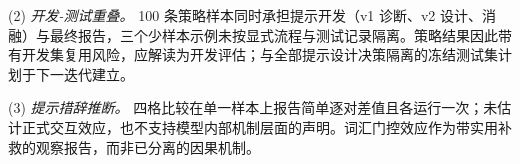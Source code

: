\documentclass[11pt]{article}
\begin{document}
(2) \textit{{\cjkfont 开\allowbreak 发}-{\cjkfont 测\allowbreak 试\allowbreak 重\allowbreak 叠\allowbreak 。}} 100 {\cjkfont 条\allowbreak 策\allowbreak 略\allowbreak 样\allowbreak 本\allowbreak 同\allowbreak 时\allowbreak 承\allowbreak 担\allowbreak 提\allowbreak 示\allowbreak 开\allowbreak 发\allowbreak （}v1 {\cjkfont 诊\allowbreak 断\allowbreak 、}v2 {\cjkfont 设\allowbreak 计\allowbreak 、\allowbreak 消\allowbreak 融\allowbreak ）\allowbreak 与\allowbreak 最\allowbreak 终\allowbreak 报\allowbreak 告\allowbreak ，\allowbreak 三\allowbreak 个\allowbreak 少\allowbreak 样\allowbreak 本\allowbreak 示\allowbreak 例\allowbreak 未\allowbreak 按\allowbreak 显\allowbreak 式\allowbreak 流\allowbreak 程\allowbreak 与\allowbreak 测\allowbreak 试\allowbreak 记\allowbreak 录\allowbreak 隔\allowbreak 离\allowbreak 。\allowbreak 策\allowbreak 略\allowbreak 结\allowbreak 果\allowbreak 因\allowbreak 此\allowbreak 带\allowbreak 有\allowbreak 开\allowbreak 发\allowbreak 集\allowbreak 复\allowbreak 用\allowbreak 风\allowbreak 险\allowbreak ，\allowbreak 应\allowbreak 解\allowbreak 读\allowbreak 为\allowbreak 开\allowbreak 发\allowbreak 评\allowbreak 估\allowbreak ；\allowbreak 与\allowbreak 全\allowbreak 部\allowbreak 提\allowbreak 示\allowbreak 设\allowbreak 计\allowbreak 决\allowbreak 策\allowbreak 隔\allowbreak 离\allowbreak 的\allowbreak 冻\allowbreak 结\allowbreak 测\allowbreak 试\allowbreak 集\allowbreak 计\allowbreak 划\allowbreak 于\allowbreak 下\allowbreak 一\allowbreak 迭\allowbreak 代\allowbreak 建\allowbreak 立\allowbreak 。}

(3) \textit{{\cjkfont 提\allowbreak 示\allowbreak 措\allowbreak 辞\allowbreak 推\allowbreak 断\allowbreak 。}} {\cjkfont 四\allowbreak 格\allowbreak 比\allowbreak 较\allowbreak 在\allowbreak 单\allowbreak 一\allowbreak 样\allowbreak 本\allowbreak 上\allowbreak 报\allowbreak 告\allowbreak 简\allowbreak 单\allowbreak 逐\allowbreak 对\allowbreak 差\allowbreak 值\allowbreak 且\allowbreak 各\allowbreak 运\allowbreak 行\allowbreak 一\allowbreak 次\allowbreak ；\allowbreak 未\allowbreak 估\allowbreak 计\allowbreak 正\allowbreak 式\allowbreak 交\allowbreak 互\allowbreak 效\allowbreak 应\allowbreak ，\allowbreak 也\allowbreak 不\allowbreak 支\allowbreak 持\allowbreak 模\allowbreak 型\allowbreak 内\allowbreak 部\allowbreak 机\allowbreak 制\allowbreak 层\allowbreak 面\allowbreak 的\allowbreak 声\allowbreak 明\allowbreak 。\allowbreak 词\allowbreak 汇\allowbreak 门\allowbreak 控\allowbreak 效\allowbreak 应\allowbreak 作\allowbreak 为\allowbreak 带\allowbreak 实\allowbreak 用\allowbreak 补\allowbreak 救\allowbreak 的\allowbreak 观\allowbreak 察\allowbreak 报\allowbreak 告\allowbreak ，\allowbreak 而\allowbreak 非\allowbreak 已\allowbreak 分\allowbreak 离\allowbreak 的\allowbreak 因\allowbreak 果\allowbreak 机\allowbreak 制\allowbreak 。}
\end{document}

